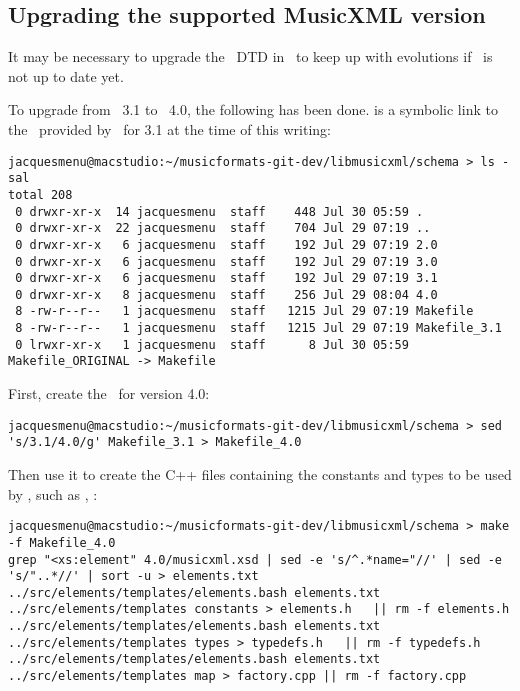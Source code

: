 \subsection{Upgrading the supported MusicXML version}

It may be necessary to upgrade the \mxml\ DTD in \elementsFolder\ to keep up with evolutions if \libmusicxml\ is not up to date yet.

To upgrade from \mxml\ 3.1 to \mxml\ 4.0, the following has been done.  is a symbolic link to the \Makefile\ provided by \libmusicxml\ for 3.1 at the time of this writing:
\begin{lstlisting}[language=Terminal]
jacquesmenu@macstudio:~/musicformats-git-dev/libmusicxml/schema > ls -sal
total 208
 0 drwxr-xr-x  14 jacquesmenu  staff    448 Jul 30 05:59 .
 0 drwxr-xr-x  22 jacquesmenu  staff    704 Jul 29 07:19 ..
 0 drwxr-xr-x   6 jacquesmenu  staff    192 Jul 29 07:19 2.0
 0 drwxr-xr-x   6 jacquesmenu  staff    192 Jul 29 07:19 3.0
 0 drwxr-xr-x   6 jacquesmenu  staff    192 Jul 29 07:19 3.1
 0 drwxr-xr-x   8 jacquesmenu  staff    256 Jul 29 08:04 4.0
 8 -rw-r--r--   1 jacquesmenu  staff   1215 Jul 29 07:19 Makefile
 8 -rw-r--r--   1 jacquesmenu  staff   1215 Jul 29 07:19 Makefile_3.1
 0 lrwxr-xr-x   1 jacquesmenu  staff      8 Jul 30 05:59 Makefile_ORIGINAL -> Makefile
\end{lstlisting}

First, create the \Makefile\ for version 4.0:
\begin{lstlisting}[language=Terminal]
jacquesmenu@macstudio:~/musicformats-git-dev/libmusicxml/schema > sed 's/3.1/4.0/g' Makefile_3.1 > Makefile_4.0
\end{lstlisting}

Then use it to create the C++ files containing the constants and types to be used by \mxsrRepr, such as , :
\begin{lstlisting}[language=Terminal]
jacquesmenu@macstudio:~/musicformats-git-dev/libmusicxml/schema > make -f Makefile_4.0
grep "<xs:element" 4.0/musicxml.xsd | sed -e 's/^.*name="//' | sed -e 's/"..*//' | sort -u > elements.txt
../src/elements/templates/elements.bash elements.txt ../src/elements/templates constants > elements.h   || rm -f elements.h
../src/elements/templates/elements.bash elements.txt ../src/elements/templates types > typedefs.h   || rm -f typedefs.h
../src/elements/templates/elements.bash elements.txt ../src/elements/templates map > factory.cpp || rm -f factory.cpp
\end{lstlisting}

